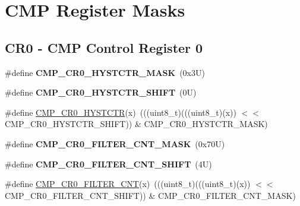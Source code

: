 \hypertarget{group___c_m_p___register___masks}{}\section{C\+MP Register Masks}
\label{group___c_m_p___register___masks}
\subsection*{C\+R0 -\/ C\+MP Control Register 0}
\begin{DoxyCompactItemize}
\item 
\mbox{\label{group___c_m_p___register___masks_ga9a81a95d8ceda15abb107f3c961e2f03}} 
\#define {\bfseries C\+M\+P\+\_\+\+C\+R0\+\_\+\+H\+Y\+S\+T\+C\+T\+R\+\_\+\+M\+A\+SK}~(0x3\+U)
\item 
\mbox{\label{group___c_m_p___register___masks_ga12a965eae39b79d9e6066de9af418df3}} 
\#define {\bfseries C\+M\+P\+\_\+\+C\+R0\+\_\+\+H\+Y\+S\+T\+C\+T\+R\+\_\+\+S\+H\+I\+FT}~(0\+U)
\item 
\#define \mbox{\hyperlink{group___c_m_p___register___masks_ga78eaf28aa2956818501310daaeffca74}{C\+M\+P\+\_\+\+C\+R0\+\_\+\+H\+Y\+S\+T\+C\+TR}}(x)~(((uint8\+\_\+t)(((uint8\+\_\+t)(x)) $<$$<$ C\+M\+P\+\_\+\+C\+R0\+\_\+\+H\+Y\+S\+T\+C\+T\+R\+\_\+\+S\+H\+I\+FT)) \& C\+M\+P\+\_\+\+C\+R0\+\_\+\+H\+Y\+S\+T\+C\+T\+R\+\_\+\+M\+A\+SK)
\item 
\mbox{\label{group___c_m_p___register___masks_gab1e98c122818fe880217f72fab932ac2}} 
\#define {\bfseries C\+M\+P\+\_\+\+C\+R0\+\_\+\+F\+I\+L\+T\+E\+R\+\_\+\+C\+N\+T\+\_\+\+M\+A\+SK}~(0x70\+U)
\item 
\mbox{\label{group___c_m_p___register___masks_ga07a4d57ab7d44b55b3d73f612aa7dd98}} 
\#define {\bfseries C\+M\+P\+\_\+\+C\+R0\+\_\+\+F\+I\+L\+T\+E\+R\+\_\+\+C\+N\+T\+\_\+\+S\+H\+I\+FT}~(4\+U)
\item 
\#define \mbox{\hyperlink{group___c_m_p___register___masks_ga1f6d81f303672acd661263de6da7ea13}{C\+M\+P\+\_\+\+C\+R0\+\_\+\+F\+I\+L\+T\+E\+R\+\_\+\+C\+NT}}(x)~(((uint8\+\_\+t)(((uint8\+\_\+t)(x)) $<$$<$ C\+M\+P\+\_\+\+C\+R0\+\_\+\+F\+I\+L\+T\+E\+R\+\_\+\+C\+N\+T\+\_\+\+S\+H\+I\+FT)) \& C\+M\+P\+\_\+\+C\+R0\+\_\+\+F\+I\+L\+T\+E\+R\+\_\+\+C\+N\+T\+\_\+\+M\+A\+SK)
\end{DoxyCompactItemize}

